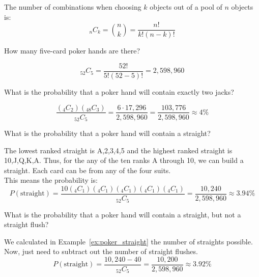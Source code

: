 \documentclass{beamer}
\newcommand{\prob}[1]{P\left(#1\right)}
\newcommand{\comb}[2]{_{#1}C_{#2}}
\begin{document}
\begin{frame}
\begin{definition}
The number of combinations when choosing $k$ objects out of a pool of $n$ objects is:
\begin{equation*}
\comb{n}{k}=\binom{n}{k} = \dfrac{n!}{k!\left(n-k\right)!}
\end{equation*}
\end{definition}\pause

\begin{example}
How many five-card poker hands are there?\pause

\begin{equation*}
\comb{52}{5} = \dfrac{52!}{5!\left(52-5\right)!} = 2,598,960
\end{equation*}
\end{example}\pause

\begin{example}\label{ex:poker_straight}
What is the probability that a poker hand will contain exactly two jacks?\pause

\begin{equation*}
\dfrac{\left(\comb{4}{2}\right)\left(\comb{48}{3}\right)}{\comb{52}{5}} = \dfrac{6\cdot17,296}{2,598,960} = \dfrac{103,776}{2,598,960} \approx 4\%
\end{equation*}
\end{example}
\end{frame}

\begin{frame}
\begin{example}
What is the probability that a poker hand will contain a straight?\pause

\vspace{2mm}
The lowest ranked straight is A,2,3,4,5 and the highest ranked straight is 10,J,Q,K,A. Thus, for the any of the ten ranks A through 10, we can build a straight. Each card can be from any of the four suits.\\ This means the probability is:
\begin{equation*}
\prob{\text{straight}} = \dfrac{10\left(\comb{4}{1}\right)\left(\comb{4}{1}\right)\left(\comb{4}{1}\right)\left(\comb{4}{1}\right)\left(\comb{4}{1}\right)}{\comb{52}{5}} = \dfrac{10,240}{2,598,960} \approx 3.94\%
\end{equation*}
\end{example}\pause

\begin{example}
What is the probability that a poker hand will contain a straight, but not a straight flush?\pause

We calculated in Example~\ref{ex:poker_straight} the number of straights possible. Now, just need to subtract out the number of straight flushes.
\begin{equation*}
\prob{\text{straight}} = \dfrac{10,240 - 40}{\comb{52}{5}} = \dfrac{10,200}{2,598,960} \approx 3.92\%
\end{equation*}

\end{example}
\end{frame}
\end{document}
